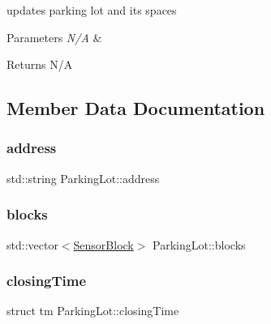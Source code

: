 updates parking lot and its spaces 


\begin{DoxyParams}{Parameters}
{\em N/A} & \\
\hline
\end{DoxyParams}
\begin{DoxyReturn}{Returns}
N/A 
\end{DoxyReturn}


\subsection{Member Data Documentation}
\mbox{\label{class_parking_lot_a0a2cd92fd4fb8e78530613df950a44bb}} 
\subsubsection{\texorpdfstring{address}{address}}
{\footnotesize\ttfamily std\+::string Parking\+Lot\+::address\hspace{0.3cm}{\ttfamily [private]}}

\mbox{\label{class_parking_lot_ab5c594dda31fdbef491887eb57162658}} 
\subsubsection{\texorpdfstring{blocks}{blocks}}
{\footnotesize\ttfamily std\+::vector$<$\mbox{\hyperlink{class_sensor_block}{Sensor\+Block}}$>$ Parking\+Lot\+::blocks\hspace{0.3cm}{\ttfamily [private]}}

\mbox{\label{class_parking_lot_ae3607cdf93ec2858e0ce1214c950b255}} 
\subsubsection{\texorpdfstring{closing\+Time}{closingTime}}
{\footnotesize\ttfamily struct tm Parking\+Lot\+::closing\+Time\hspace{0.3cm}{\ttfamily [private]}}

